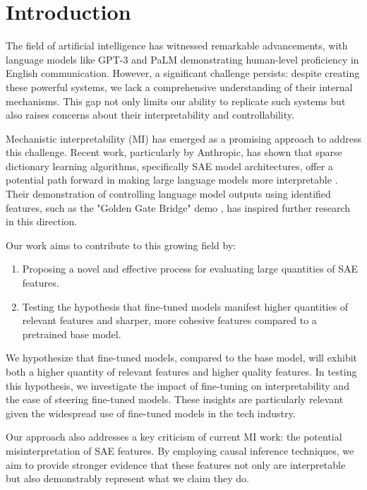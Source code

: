 \section{Introduction}

The field of artificial intelligence has witnessed remarkable advancements, with language models like GPT-3 and PaLM demonstrating human-level proficiency in English communication. However, a significant challenge persists: despite creating these powerful systems, we lack a comprehensive understanding of their internal mechanisms. This gap not only limits our ability to replicate such systems but also raises concerns about their interpretability and controllability.

Mechanistic interpretability (MI) has emerged as a promising approach to address this challenge. Recent work, particularly by Anthropic, has shown that sparse dictionary learning algorithms, specifically SAE model architectures, offer a potential path forward in making large language models more interpretable \cite{bricken2023monosemanticity}. Their demonstration of controlling language model outputs using identified features, such as the "Golden Gate Bridge" demo \cite{templeton2024scaling}, has inspired further research in this direction.

Our work aims to contribute to this growing field by:

\begin{enumerate}
    \item Proposing a novel and effective process for evaluating large quantities of SAE features.
    \item Testing the hypothesis that fine-tuned models manifest higher quantities of relevant features and sharper, more cohesive features compared to a pretrained base model.
\end{enumerate}

We hypothesize that fine-tuned models, compared to the base model, will exhibit both a higher quantity of relevant features and higher quality features. In testing this hypothesis, we investigate the impact of fine-tuning on interpretability and the ease of steering fine-tuned models. These insights are particularly relevant given the widespread use of fine-tuned models in the tech industry.

Our approach also addresses a key criticism of current MI work: the potential misinterpretation of SAE features. By employing causal inference techniques, we aim to provide stronger evidence that these features not only are interpretable but also demonstrably represent what we claim they do.

